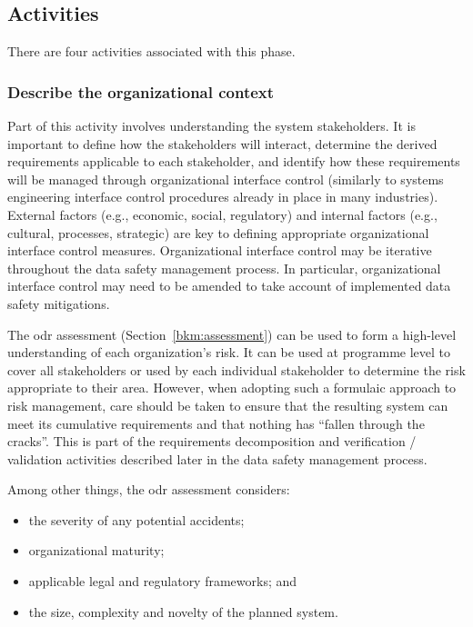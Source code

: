 \subsection{Activities}
There are four activities associated with this phase.

\subsubsection{Describe the organizational context}
Part of this activity involves understanding the system \glspl{stakeholder}. It is important to define how the \glspl{stakeholder} will interact, determine the derived requirements applicable to each \gls{stakeholder}, and identify how these requirements will be managed through organizational interface control (similarly to systems engineering interface control procedures already in place in many industries). External factors (e.g., economic, social, regulatory) and internal factors (e.g., cultural, processes, strategic) are key to defining appropriate organizational interface control measures. Organizational interface control may be iterative throughout the \cbstart data safety management process\cbend. In particular, organizational interface control may need to be amended to take account of implemented data safety \glspl{mitigation}.

The \gls{odr} assessment (Section~\ref{bkm:assessment}) can be used to form a high-level understanding of each organization's risk. It can be used at programme level to cover all \glspl{stakeholder} or used by each individual \gls{stakeholder} to determine the
risk appropriate to their area. However, when adopting such a formulaic approach to risk \cbstart management\cbend, care should be taken 
to ensure that the resulting system can meet its cumulative requirements and that nothing has ``fallen through the cracks''. This is part of the requirements decomposition and \gls{verification} / \gls{validation} activities described later in the data safety management process.

Among other things, the \gls{odr} assessment considers:
\begin{itemize}
	\item the severity of any potential accidents;
	\item organizational maturity; 
	\item applicable legal and regulatory frameworks; and 
	\item the size, complexity and novelty of the planned system.
\end{itemize}

